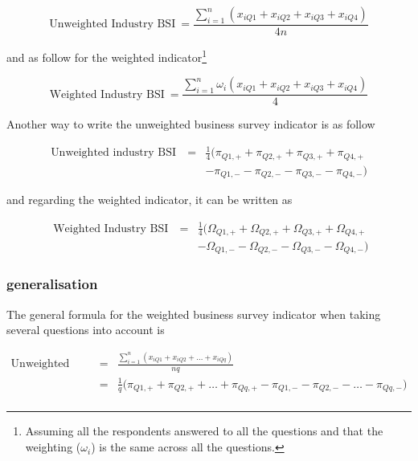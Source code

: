 \documentclass[12pt,a4paper,oneside]{book}
\begin{document}
\begin{equation}
    \mbox{Unweighted Industry BSI}\ = \frac{\sum^n_{i=1}(x_{iQ1} + x_{iQ2} + x_{iQ3} + x_{iQ4})}{4n} 
\end{equation} 


and as follow for the weighted indicator\footnote{Assuming all the respondents answered to all the questions and that the weighting ($\omega_i$) is the same across all the questions.}


\begin{equation}
    \mbox{Weighted Industry BSI}\ = \frac{\sum^n_{i=1} \omega_i (x_{iQ1} + x_{iQ2} + x_{iQ3} + x_{iQ4})}{4} 
\end{equation} 



Another way to write the unweighted business survey indicator is as follow

\begin{eqnarray}
    \mbox{Unweighted industry BSI}\ &=& \frac{1}{4} \big( \pi_{Q1,+} + \pi_{Q2,+} + \pi_{Q3,+} + \pi_{Q4,+} \nonumber \\
    && - \pi_{Q1,-} - \pi_{Q2,-} - \pi_{Q3,-} - \pi_{Q4,-} \big)
\end{eqnarray}

and regarding the weighted indicator, it can be written as

\begin{eqnarray}
    \mbox{ Weighted Industry BSI}\ &=& \frac{1}{4} \big( \Omega_{Q1,+} + \Omega_{Q2,+} + \Omega_{Q3,+} + \Omega_{Q4,+} \nonumber \\
    && - \Omega_{Q1,-} - \Omega_{Q2,-} - \Omega_{Q3,-} - \Omega_{Q4,-} \big) 
\end{eqnarray}

\subsubsection{generalisation}

The general formula for the weighted business survey indicator when taking several questions into account is

\begin{eqnarray}
    \mbox{Unweighted BSI} &=& \frac{\sum^n_{i=1}( x_{iQ1} + x_{iQ2} + \ldots + x_{iQq})}{nq} \\
    &=& \frac{1}{q} \big( \pi_{Q1,+} +  \pi_{Q2,+} + \ldots +  \pi_{Qq,+}  -  \pi_{Q1,-} -  \pi_{Q2,-} - \ldots - \pi_{Qq,-} \big) \nonumber\\
\end{eqnarray}
\end{document}
